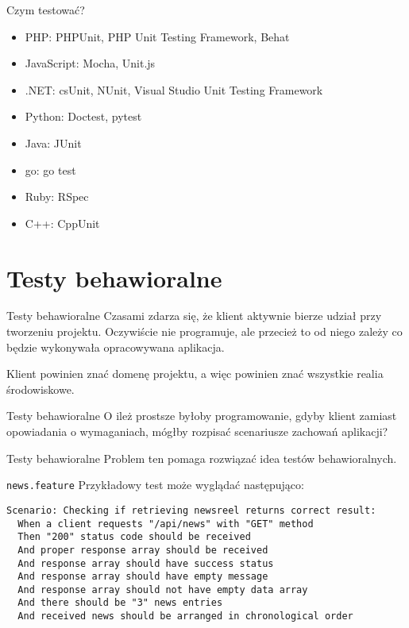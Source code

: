 \begin{frame}{Czym testować?}
	\begin{itemize}
	\item PHP: PHPUnit, PHP Unit Testing Framework, Behat
	\item JavaScript: Mocha, Unit.js
	\item .NET: csUnit, NUnit, Visual Studio Unit Testing Framework
	\item Python: Doctest, pytest
	\item Java: JUnit
	\item go: go test
	\item Ruby: RSpec
	\item C++: CppUnit
	\end{itemize}
\end{frame}
	
\section{Testy behawioralne}

\begin{frame}{Testy behawioralne}
	Czasami zdarza się, że klient aktywnie bierze udział przy tworzeniu projektu. Oczywiście nie programuje, ale przecież to od niego zależy co będzie wykonywała opracowywana aplikacja.
	
	Klient powinien znać domenę projektu, a więc powinien znać wszystkie realia środowiskowe.
\end{frame}

\begin{frame}{Testy behawioralne}
	O ileż prostsze byłoby programowanie, gdyby klient zamiast opowiadania o wymaganiach, mógłby rozpisać scenariusze zachowań aplikacji?
\end{frame}

\begin{frame}{Testy behawioralne}
	Problem ten pomaga rozwiązać idea testów behawioralnych.
\end{frame}

\begin{frame}[fragile]{\texttt{news.feature}}	
	Przykładowy test może wyglądać następująco:
	
\begin{lstlisting}
Scenario: Checking if retrieving newsreel returns correct result:
  When a client requests "/api/news" with "GET" method
  Then "200" status code should be received
  And proper response array should be received
  And response array should have success status
  And response array should have empty message
  And response array should not have empty data array
  And there should be "3" news entries
  And received news should be arranged in chronological order
\end{lstlisting}
\end{frame}

